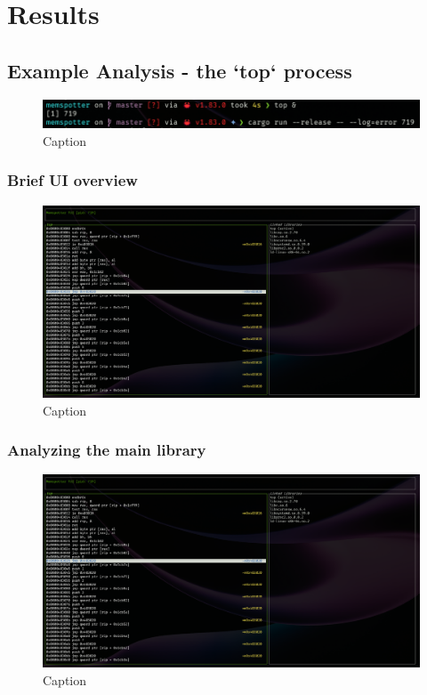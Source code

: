 \chapter{Results}
\label{cha:results}

\section{Example Analysis - the `top` process}

\begin{figure}
    \centering
    \includegraphics[width=0.5\linewidth]{cli-run.png}
    \caption{Caption}
    \label{fig:enter-label}
\end{figure}

\subsection{Brief UI overview}

\begin{figure}
    \centering
    \includegraphics[width=0.5\linewidth]{tui-main.png}
    \caption{Caption}
    \label{fig:enter-label}
\end{figure}

\subsection{Analyzing the main library}

\begin{figure}
    \centering
    \includegraphics[width=0.5\linewidth]{tui-main.png}
    \caption{Caption}
    \label{fig:enter-label}
\end{figure}

